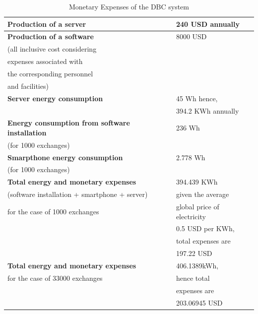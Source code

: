 \documentclass[conference]{IEEEtran}
\begin{document}
\begin{table}[htbp]
\caption{Monetary Expenses of the DBC system}
\begin{center}
\begin{tabular}{|l|l|}
\hline
\textbf{Production of a server} & 240 USD annually \\ \hline
\textbf{Production of a software} & 8000 USD \\ %
(all inclusive cost considering &  \\
expenses associated with &  \\ 
the corresponding personnel & \\
and facilities) & \\\hline
\textbf{Server energy consumption} & 45 Wh hence,\\ %
 & 394.2 KWh annually \\ \hline
\textbf{Energy consumption from software installation} & 236 Wh\\ (for 1000 exchanges) & \\ \hline
\textbf{Smarpthone energy consumption} & 2.778 Wh \\ 
(for 1000 exchanges) & \\ \hline
\textbf{Total energy and monetary expenses} & 394.439 KWh\\
 (software installation + smartphone + server) & given the average \\
 for the case of 1000 exchanges & global price of electricity\\
 & 0.5 USD per KWh,\\
& total expenses are \\
& 197.22 USD \\
\hline

\textbf{Total energy and monetary expenses} & 406.1389kWh,   \\ 
for the case of 33000 exchanges & hence total\\
& expenses are \\
& 203.06945 USD \\
 \hline
 

\end{tabular}
\end{center}
\label{PBCcalc}
\end{table}
\end{document}
